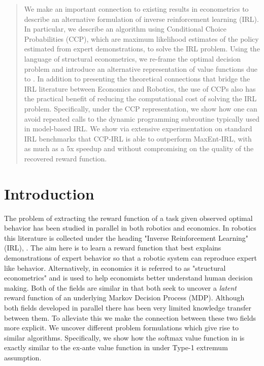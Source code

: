 \documentclass{article}
\begin{document}
\begin{abstract}
We make an important connection to existing results in econometrics to describe an alternative formulation of inverse reinforcement learning (IRL). In particular, we describe an algorithm using Conditional Choice Probabilities (CCP), which are maximum likelihood estimates of the policy estimated from expert demonstrations, to solve the IRL problem. Using the language of structural econometrics, we re-frame the optimal decision problem and introduce an alternative representation of value functions due to \cite{hotz}. In addition to presenting the theoretical connections that bridge the IRL literature between Economics and Robotics, the use of CCPs also has the practical benefit of reducing the computational cost of solving the IRL problem. Specifically, under the CCP representation, we show how one can avoid repeated calls to the dynamic programming subroutine typically used in model-based IRL. We show via extensive experimentation on standard IRL benchmarks that CCP-IRL is able to outperform MaxEnt-IRL, with as much as a 5x speedup and without compromising on the quality of the recovered reward function.
\end{abstract} 

\section{Introduction}

The problem of extracting the reward function of a task given observed optimal behavior has been studied in parallel in both robotics and economics. In robotics this literature is collected under the heading "Inverse Reinforcement Learning" (IRL), \cite{Ng2000, abbeel2004apprenticeship}. The aim here is to learn a reward function that best explains demonstrations of expert behavior so that a robotic system can reproduce expert like behavior. Alternatively, in economics it is referred to as "structural econometrics" \cite{miller, pakes, rust_gmc} and is used to help economists better understand human decision making. Both of the fields are similar in that both seek to uncover a \emph{latent} reward function of an underlying Markov Decision Process (MDP).
Although both fields developed in parallel there has been very limited knowledge transfer between them. To alleviate this we make the connection between these two fields more explicit. We uncover different problem formulations which give rise to similar algorithms. Specifically, we show how the softmax value function in \cite{ziebart} is exactly similar to the ex-ante value function in \cite{rust_gmc} under Type-1 extremum assumption.
\end{document}

